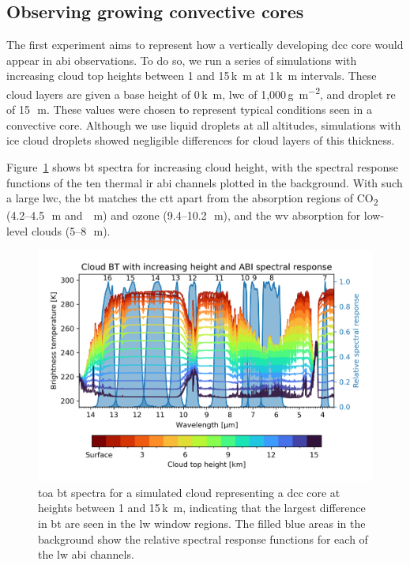\subsection{Observing growing convective cores}\label{sec:theory_core}

The first experiment aims to represent how a vertically developing \acrshort{dcc} core would appear in \acrshort{abi} observations.
To do so, we run a series of simulations with increasing cloud top heights between 1 and 15\,\unit{k m} at 1\,\unit{k m} intervals.
These cloud layers are given a base height of 0\,\unit{k m}, \acrfull{lwc} of 1,000\,\unit{g m^{-2}}, and droplet \acrfull{re} of 15\,\unit{\mu m}.
These values were chosen to represent typical conditions seen in a convective core.
Although we use liquid droplets at all altitudes, simulations with ice cloud droplets showed negligible differences for cloud layers of this thickness.

Figure~\ref{fig:cloud_height_spectra} shows \acrshort{bt} spectra for increasing cloud height, with the spectral response functions of the ten thermal \acrshort{ir} \acrshort{abi} channels plotted in the background.
With such a large \acrshort{lwc}, the \acrshort{bt} matches the \acrshort{ctt} apart from the absorption regions of CO\textsubscript{2} (4.2--4.5\,\unit{\mu m} and \,\unit{\mu m}) and ozone (9.4--10.2\,\unit{\mu m}), and the \acrshort{wv} absorption for low-level clouds (5--8\,\unit{\mu m}).


\begin{figure}[tp]
    \includegraphics[width=\textwidth]{figures/chapter1_05.png}
    \caption[
    \acrshort{toa} \acrshort{bt} spectra for a simulated cloud representing a \acrshort{dcc} core at heights between 1 and 15\,\unit{k m}
    ]{
    \acrshort{toa} \acrshort{bt} spectra for a simulated cloud representing a \acrshort{dcc} core at heights between 1 and 15\,\unit{k m}, indicating that the largest difference in \acrshort{bt} are seen in the \acrshort{lw} window regions. The filled blue areas in the background show the relative spectral response functions for each of the \acrshort{lw} \acrshort{abi} channels.
    }
    \label{fig:cloud_height_spectra}
\end{figure}


